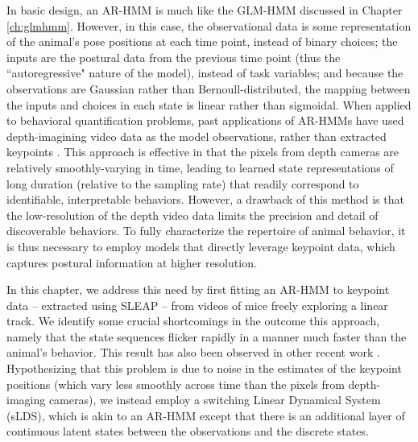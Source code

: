 In basic design, an AR-HMM is much like the GLM-HMM discussed in Chapter \ref{ch:glmhmm}. However, in this case, the observational data is some representation of the animal's pose positions at each time point, instead of binary choices; the inputs are the postural data from the previous time point (thus the ``autoregressive" nature of the model), instead of task variables; and because the observations are Gaussian rather than Bernoull-distributed, the mapping between the inputs and choices in each state is linear rather than sigmoidal. When applied to behavioral quantification problems, past applications of AR-HMMs have used depth-imagining video data as the model observations, rather than extracted keypoints \cite{wiltschko_mapping_2015, markowitz_striatum_2018, wiltschko_revealing_2020}. This approach is effective in that the pixels from depth cameras are relatively smoothly-varying in time, leading to learned state representations of long duration (relative to the sampling rate) that readily correspond to identifiable, interpretable behaviors. However, a drawback of this method is that the low-resolution of the depth video data limits the precision and detail of discoverable behaviors. To fully characterize the repertoire of animal behavior, it is thus necessary to employ models that directly leverage keypoint data, which captures postural information at higher resolution. 

In this chapter, we address this need by first fitting an AR-HMM to keypoint data -- extracted using SLEAP \cite{pereira_sleap_2022} -- from videos of mice freely exploring a linear track. We identify some crucial shortcomings in the outcome this approach, namely that the state sequences flicker rapidly in a manner much faster than the animal's behavior. This result has also been observed in other recent work \cite{wu_deep_2020, luxem_identifying_2022}. Hypothesizing that this problem is due to noise in the estimates of the keypoint positions (which vary less smoothly across time than the pixels from depth-imaging cameras), we instead employ a switching Linear Dynamical System (sLDS), which is akin to an AR-HMM except that there is an additional layer of continuous latent states between the observations and the discrete states. 

